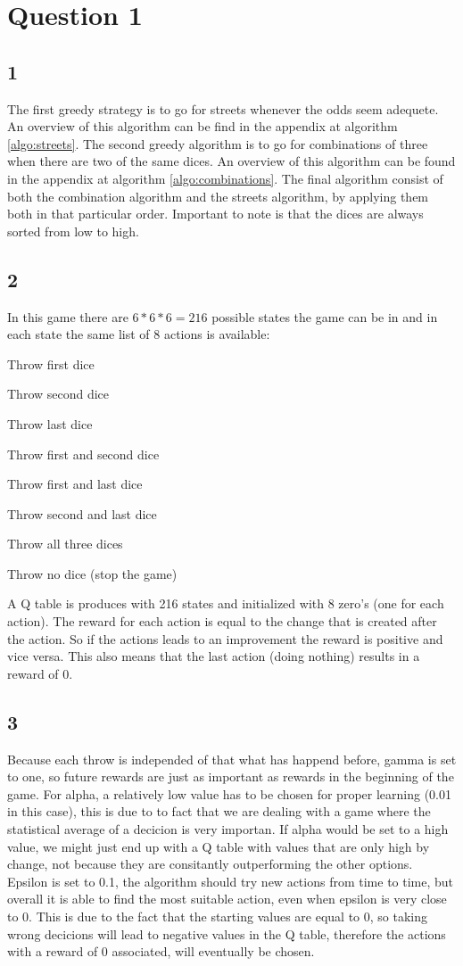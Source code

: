 \section*{Question 1}
\subsection*{1}
The first greedy strategy is to go for streets whenever the odds seem adequete. An overview of this algorithm can be find in the appendix at algorithm \ref{algo:streets}. The second greedy algorithm is to go for combinations of three when there are two of the same dices. An overview of this algorithm can be found in the appendix at algorithm \ref{algo:combinations}. The final algorithm consist of both the combination algorithm and the streets algorithm, by applying them both in that particular order. Important to note is that the dices are always sorted from low to high. 
\subsection*{2}
In this game there are $6 * 6 * 6 = 216$ possible states the game can be in and in each state the same list of 8 actions is available:
\begin{description}
	\item Throw first dice
	\item Throw second dice
	\item Throw last dice
	\item Throw first and second dice
	\item Throw first and last dice
	\item Throw second and last dice
	\item Throw all three dices
	\item Throw no dice (stop the game)
\end{description}
A Q table is produces with 216 states and initialized with 8 zero's (one for each action). The reward for each action is equal to the change that is created after the action. So if the actions leads to an improvement the reward is positive and vice versa. This also means that the last action (doing nothing) results in a reward of 0.
\subsection*{3}
Because each throw is independed of that what has happend before, gamma is set to one, so future rewards are just as important as rewards in the beginning of the game. For alpha, a relatively low value has to be chosen for proper learning (0.01 in this case), this is due to to fact that we are dealing with a game where the statistical average of a decicion is very importan. If alpha would be set to a high value, we might just end up with a Q table with values that are only high by change, not because they are consitantly outperforming the other options. Epsilon is set to 0.1, the algorithm should try new actions from time to time, but overall it is able to find the most suitable action, even when epsilon is very close to 0. This is due to the fact that the starting values are equal to 0, so taking wrong decicions will lead to negative values in the Q table, therefore the actions with a reward of 0 associated, will eventually be chosen.
